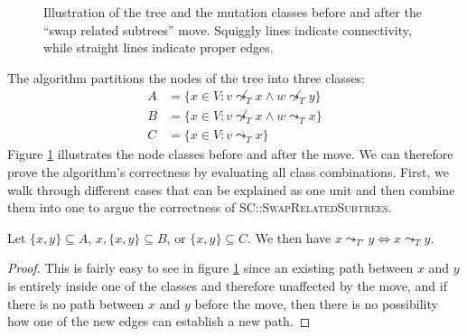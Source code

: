 \begin{figure}
    \caption{Illustration of the tree and the mutation classes before and after the ``swap related subtrees'' move. Squiggly lines indicate connectivity, while straight lines indicate proper edges.}
    \label{fig:related_swap_classes}
\end{figure}


The algorithm partitions the nodes of the tree into three classes:
\begin{align*}
    A &= \{x \in V: v \not\leadsto_T x \wedge w \not\leadsto_T y\} \\
    B &= \{x \in V: v \not\leadsto_T x \wedge w \leadsto_T x\} \\
    C &= \{x \in V: v \leadsto_T x\}
\end{align*}
Figure \ref{fig:related_swap_classes} illustrates the node classes before and after the move. We can therefore prove the algorithm's correctness by evaluating all class combinations. First, we walk through different cases that can be explained as one unit and then combine them into one to argue the correctness of \textsc{SC::SwapRelatedSubtrees}.

\begin{lemma}
    \label{lem:related_swap_equal}
    Let $\{x, y\} \subseteq A$, $x, \{x, y\} \subseteq B$, or $\{x, y\} \subseteq C$. We then have $x \leadsto_{T'} y \Leftrightarrow x \leadsto_T y$.
\end{lemma}

\begin{proof}
    This is fairly easy to see in figure \ref{fig:related_swap_classes} since an existing path between $x$ and $y$ is entirely inside one of the classes and therefore unaffected by the move, and if there is no path between $x$ and $y$ before the move, then there is no possibility how one of the new edges can establish a new path.
\end{proof}

